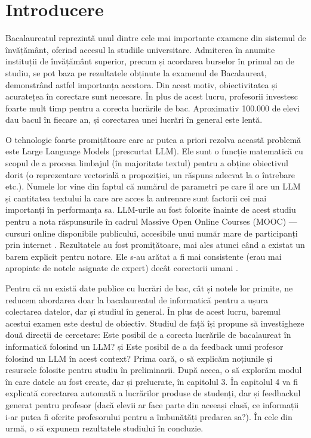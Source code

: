 \chapter{Introducere}
Bacalaureatul reprezintă unul dintre cele mai importante examene din sistemul de învățământ, oferind accesul la studiile universitare.
Admiterea în anumite instituții de învățământ superior, precum și acordarea burselor în primul an de studiu, se pot baza pe rezultatele obținute la examenul de Bacalaureat, demonstrând astfel importanța acestora.
Din acest motiv, obiectivitatea și acuratețea în corectare sunt necesare.
În plus de acest lucru, profesorii investesc foarte mult timp pentru a corecta lucrările de bac. Aproximativ 100.000 de elevi dau bacul în fiecare an, și corectarea unei lucrări în general este lentă.

O tehnologie foarte promițătoare care ar putea a priori rezolva această problemă este Large Language Models (prescurtat LLM). Ele sunt o funcție matematică cu scopul de a procesa limbajul (în majoritate textul) pentru a obține obiectivul dorit (o reprezentare vectorială a propoziției, un răspuns adecvat la o întrebare etc.).
Numele lor vine din faptul că numărul de parametri pe care îl are un LLM și cantitatea textului la care are acces la antrenare sunt factorii cei mai importanți în performanța sa.
LLM-urile au fost folosite înainte de acest studiu pentru a nota răspunsurile în cadrul Massive Open Online Courses (MOOC) — cursuri online disponibile publicului, accesibile unui număr mare de participanți prin internet \cite{golchin}.
Rezultatele au fost promițătoare, mai ales atunci când a existat un barem explicit pentru notare. Ele s-au arătat a fi mai consistente (erau mai apropiate de notele asignate de expert) decât corectorii umani \cite{golchin}.

Pentru că nu există date publice cu lucrări de bac, cât și notele lor primite, ne reducem abordarea doar la bacalaureatul de informatică pentru a ușura colectarea datelor, dar și studiul în general.
În plus de acest lucru, baremul acestui examen este destul de obiectiv.
Studiul de față își propune să investigheze două direcții de cercetare:
Este posibil de a corecta lucrările de bacalaureat în informatică folosind un LLM? și
Este posibil de a da feedback unui profesor folosind un LLM în acest context?
Prima oară, o să explicăm noțiunile și resursele folosite pentru studiu în preliminarii. După aceea, o să explorăm modul în care datele au fost create, dar și prelucrate, în capitolul 3.
În capitolul 4 va fi explicată corectarea automată a lucrărilor produse de studenți, dar și feedbackul generat pentru profesor
(dacă elevii ar face parte din aceeași clasă, ce informații i-ar putea fi oferite profesorului pentru a îmbunătăți predarea sa?).
În cele din urmă, o să expunem rezultatele studiului în concluzie.